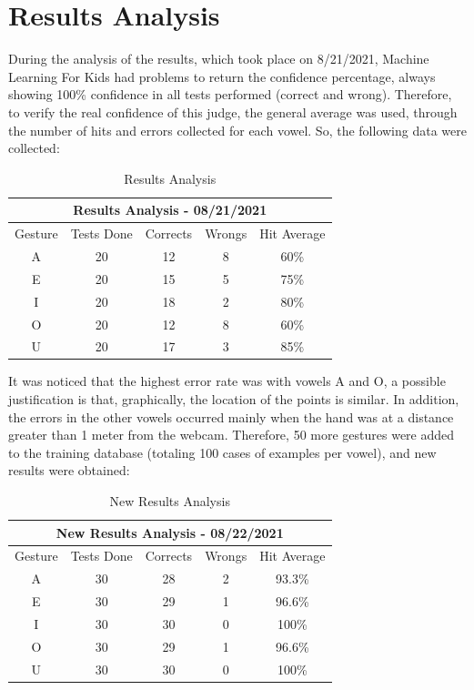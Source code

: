 \documentclass[a4paper, 12pt]{article}
\begin{document}
\section{Results Analysis}

During the analysis of the results, which took place on 8/21/2021, Machine Learning For Kids had problems to return the confidence percentage, always showing 100\% confidence in all tests performed (correct and wrong). Therefore, to verify the real confidence of this judge, the general average was used, through the number of hits and errors collected for each vowel. So, the following data were collected:


\begin{table}[h!]
    \centering
    \begin{tabular}{ |c|c|c|c|c| } 
    \hline
    \multicolumn{5}{|c|}{Results Analysis - 08/21/2021} \\
    \hline
    Gesture & Tests Done & Corrects & Wrongs & Hit Average \\
    \hline
    A & 20 & 12 & 8 & 60\% \\ 
    \hline
    E & 20 & 15 & 5 & 75\% \\
    \hline
    I & 20 & 18 & 2 & 80\% \\
    \hline
    O & 20 & 12 & 8 & 60\% \\
    \hline
    U & 20 & 17 & 3 & 85\% \\
    \hline
    \end{tabular}
    \caption{Results Analysis}
    \label{tab:results_analysis}
\end{table}

It was noticed that the highest error rate was with vowels A and O, a possible justification is that, graphically, the location of the points is similar. In addition, the errors in the other vowels occurred mainly when the hand was at a distance greater than 1 meter from the webcam. Therefore, 50 more gestures were added to the training database (totaling 100 cases of examples per vowel), and new results were obtained:

\begin{table}[h!]
    \centering
    \begin{tabular}{ |c|c|c|c|c| } 
    \hline
    \multicolumn{5}{|c|}{New Results Analysis - 08/22/2021} \\
    \hline
    Gesture & Tests Done & Corrects & Wrongs & Hit Average \\
    \hline
    A & 30 & 28 & 2 & 93.3\% \\ 
    \hline
    E & 30 & 29 & 1 & 96.6\% \\
    \hline
    I & 30 & 30 & 0 & 100\% \\
    \hline
    O & 30 & 29 & 1 & 96.6\% \\
    \hline
    U & 30 & 30 & 0 & 100\% \\
    \hline
    \end{tabular}
    \caption{New Results Analysis}
    \label{tab:results_analysis2}
\end{table}
\end{document}
